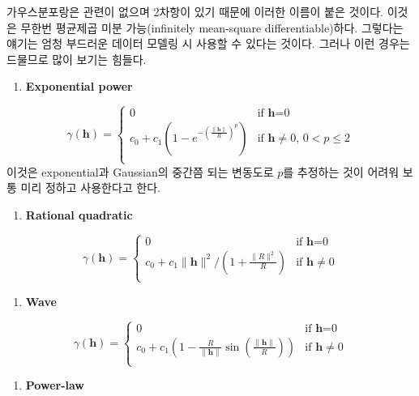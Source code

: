 \documentclass[b5paper,]{scrbook}
\providecommand{\tightlist}{%
  \setlength{\itemsep}{0pt}\setlength{\parskip}{0pt}}
\theoremstyle{plain}
\theoremstyle{definition}
\numberwithin{equation}{section}
\begin{document}
가우스분포랑은 관련이 없으며 2차항이 있기 때문에 이러한 이름이 붙은
것이다. 이것은 무한번 평균제곱 미분 가능(infinitely mean-square
differentiable)하다. 그렇다는 얘기는 엄청 부드러운 데이터 모델링 시
사용할 수 있다는 것이다. 그러나 이런 경우는 드물므로 많이 보기는 힘들다.

\begin{enumerate}
\def\labelenumi{\arabic{enumi}.}
\setcounter{enumi}{4}
\tightlist
\item
  \textbf{Exponential power}
\end{enumerate}

\[
\gamma(\mathbf{h})= \left\{ \begin{array}{ll}
0 & \textrm{if $\mathbf{h}$=0}\\
c_{0}+c_{1}(1-e^{-(\frac{\|\mathbf{h}\|}{R})^{p}}) & \textrm{if $\mathbf{h}\neq 0$, $0 < p \leq 2$}\\
\end{array} \right.
\] 이것은 exponential과 Gaussian의 중간쯤 되는 변동도로 \(p\)를 추정하는
것이 어려워 보통 미리 정하고 사용한다고 한다.

\begin{enumerate}
\def\labelenumi{\arabic{enumi}.}
\setcounter{enumi}{5}
\tightlist
\item
  \textbf{Rational quadratic}
\end{enumerate}

\[
\gamma(\mathbf{h})= \left\{ \begin{array}{ll}
0 & \textrm{if $\mathbf{h}$=0}\\
c_{0}+c_{1}\| \mathbf{h}\|^{2}/(1+\frac{\|R\|^{2}}{R}) & \textrm{if $\mathbf{h}\neq 0$}\\
\end{array} \right.
\]

\begin{enumerate}
\def\labelenumi{\arabic{enumi}.}
\setcounter{enumi}{6}
\tightlist
\item
  \textbf{Wave}
\end{enumerate}

\[
\gamma(\mathbf{h})= \left\{ \begin{array}{ll}
0 & \textrm{if $\mathbf{h}$=0}\\
c_{0}+c_{1}(1-\frac{R}{\|\mathbf{h}\|}\sin(\frac{\|\mathbf{h}\|}{R})) & \textrm{if $\mathbf{h}\neq 0$}\\
\end{array} \right.
\]

\begin{enumerate}
\def\labelenumi{\arabic{enumi}.}
\setcounter{enumi}{7}
\tightlist
\item
  \textbf{Power-law}
\end{enumerate}
\end{document}

